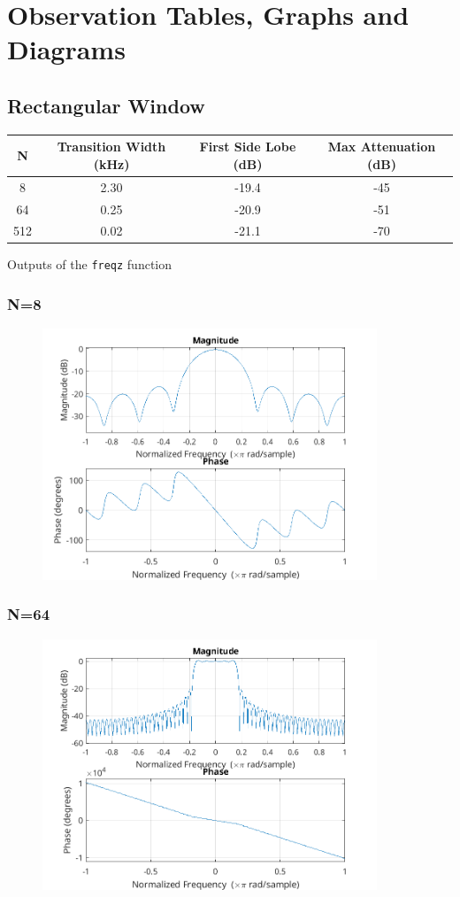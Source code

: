 \documentclass{article}
\begin{document}
\section{Observation Tables, Graphs and Diagrams}
\subsection{Rectangular Window}
\begin{center}
\begin{tabular}{||c c c c||} 
 \hline
 N & Transition Width (kHz) & First Side Lobe (dB) & Max Attenuation (dB)\\ [0.5ex] 
 \hline\hline
 8 & 2.30 & -19.4 & -45 \\ 
 64 & 0.25 & -20.9 & -51 \\
 512 & 0.02 & -21.1 & -70 \\   
 \hline
\end{tabular}
\end{center}
Outputs of the \texttt{freqz} function
  \subsubsection{N=8}
  \begin{figure}[!htb]
  \includegraphics[width=10cm]{freqz_rect_8.png}
  \end{figure}
  \subsubsection{N=64}
  \begin{figure}[!htb]
  \includegraphics[width=10cm]{freqz_rect_64.png}
  \end{figure}
\end{document}
